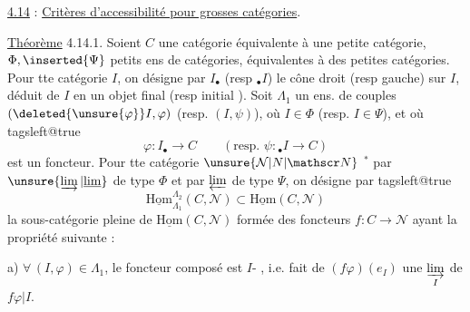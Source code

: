 \uline{4.14} : \uline{Critères d'accessibilité pour grosses catégories}.

\uline{Théorème} 4.14.1. Soient $C$ une catégorie équivalente à une petite catégorie, $\Phi,\inserted{\Psi}$  petits ens de  catégories,  équivalentes à des petites catégories. Pour tte catégorie $I$, on désigne par $I_\bullet$ (resp $ {}_\bullet I$) le cône droit (resp gauche) sur $I$, déduit de $I$ en  un objet final  (resp initial ). Soit $\Lambda_1$  un ens. de couples $(\deleted{\unsure{\varphi}}I,\varphi)$ (resp. $(I,\psi)$), où $I\in\Phi$ (resp. $I\in\Psi$), et où
\begingroup\csname tagsleft@true\endcsname\[
\varphi:I_{\bullet}\longrightarrow C\qquad(\text{resp. }\psi:{}_\bullet I\longrightarrow C)
\tag*{(4.14.1.1)}
\]\endgroup
est un foncteur. Pour tte catégorie $\unsure{\mathcal N|N|\mathscr N}$ $^*$ par $\unsure{\varinjlim|\underline{\lim}}$ de type $\Phi$ et par $\varprojlim$ de type $\Psi$, on désigne par
\begingroup\csname tagsleft@true\endcsname\[
\underline{\mathrm{Hom}}_{\Lambda_1}^{\Lambda_2}(C,\mathcal N)
\subset\underline{\mathrm{Hom}}(C,\mathcal N)
\tag*{(4.14.1.2)}
\]\endgroup
la sous-catégorie  pleine de $\underline{\mathrm{Hom}}(C,\mathcal N)$ formée des foncteurs $f:C\longrightarrow\mathcal N$  ayant la propriété suivante :

a) $\forall\,(I,\varphi)\in\Lambda_1$, le foncteur composé
est $I$- , i.e. fait de $(f\varphi)(e_I)$ une $\underset{I}{\varinjlim}$ de $f\varphi|I$.
